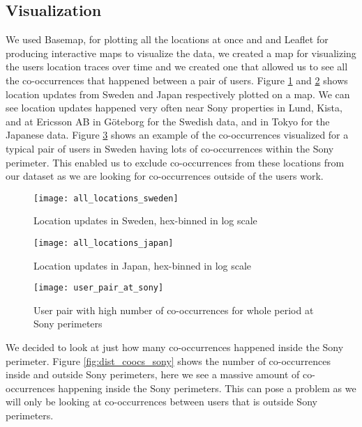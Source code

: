 \subsection{Visualization}
We used Basemap\cite{basemap}, for plotting all the locations at once and and Leaflet\cite{leaflet} for producing interactive maps to visualize the data, we created a map for visualizing the users location traces over time and we created one that allowed us to see all the co-occurrences that happened between a pair of users. Figure \ref{fig:sweden_locations_hexbin} and \ref{fig:japan_locations_hexbin} shows location updates from Sweden and Japan respectively plotted on a map. We can see location updates happened very often near Sony properties in Lund\cite{sony_headquarters_sweden_lund}, Kista\cite{sony_headquarters_sweden_kista}, and at Ericsson AB in Göteborg\cite{ericsson} for the Swedish data, and in Tokyo\cite{sony_headquarters_japan} for the Japanese data. Figure \ref{fig:user_pair_at_sony} shows an example of the co-occurrences visualized for a typical pair of users in Sweden having lots of co-occurrences within the Sony perimeter. This enabled us to exclude co-occurrences from these locations from our dataset as we are looking for co-occurrences outside of the users work.
\begin{figure}[H]
    \hspace*{-1.0cm}
    \centering
    \texttt{[image: all\_locations\_sweden]}
    \caption{Location updates in Sweden, hex-binned in log scale}
    \label{fig:sweden_locations_hexbin}
\end{figure}
\begin{figure}[H]
    \hspace*{-1.0cm}
    \centering
    \texttt{[image: all\_locations\_japan]}
    \caption{Location updates in Japan, hex-binned in log scale}
    \label{fig:japan_locations_hexbin}
\end{figure}
\begin{figure}[H]
    \hspace*{-1.0cm}
    \centering
    \texttt{[image: user\_pair\_at\_sony]}
    \caption{User pair with high number of co-occurrences for whole period at Sony perimeters}
    \label{fig:user_pair_at_sony}
\end{figure}

We decided to look at just how many co-occurrences happened inside the Sony perimeter. Figure \ref{fig:dist_coocs_sony} shows the number of co-occurrences inside and outside Sony perimeters, here we see a massive amount of co-occurrences happening inside the Sony perimeters. This can pose a problem as we will only be looking at co-occurrences between users that is outside Sony perimeters.


